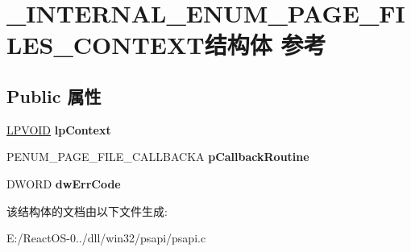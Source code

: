 \hypertarget{struct___i_n_t_e_r_n_a_l___e_n_u_m___p_a_g_e___f_i_l_e_s___c_o_n_t_e_x_t}{}\section{\+\_\+\+I\+N\+T\+E\+R\+N\+A\+L\+\_\+\+E\+N\+U\+M\+\_\+\+P\+A\+G\+E\+\_\+\+F\+I\+L\+E\+S\+\_\+\+C\+O\+N\+T\+E\+X\+T结构体 参考}
\label{struct___i_n_t_e_r_n_a_l___e_n_u_m___p_a_g_e___f_i_l_e_s___c_o_n_t_e_x_t}
\subsection*{Public 属性}
\begin{DoxyCompactItemize}
\item 
\mbox{\label{struct___i_n_t_e_r_n_a_l___e_n_u_m___p_a_g_e___f_i_l_e_s___c_o_n_t_e_x_t_a3828f08b601690fe92c8f27b73d7449f}} 
\hyperlink{interfacevoid}{L\+P\+V\+O\+ID} {\bfseries lp\+Context}
\item 
\mbox{\label{struct___i_n_t_e_r_n_a_l___e_n_u_m___p_a_g_e___f_i_l_e_s___c_o_n_t_e_x_t_a51bbb7f587849d269d368ea92adf57ad}} 
P\+E\+N\+U\+M\+\_\+\+P\+A\+G\+E\+\_\+\+F\+I\+L\+E\+\_\+\+C\+A\+L\+L\+B\+A\+C\+KA {\bfseries p\+Callback\+Routine}
\item 
\mbox{\label{struct___i_n_t_e_r_n_a_l___e_n_u_m___p_a_g_e___f_i_l_e_s___c_o_n_t_e_x_t_a5854f768294f91dbece58b549c7b39b5}} 
D\+W\+O\+RD {\bfseries dw\+Err\+Code}
\end{DoxyCompactItemize}


该结构体的文档由以下文件生成\+:\begin{DoxyCompactItemize}
\item 
E\+:/\+React\+O\+S-\/0../dll/win32/psapi/psapi.\+c\end{DoxyCompactItemize}
